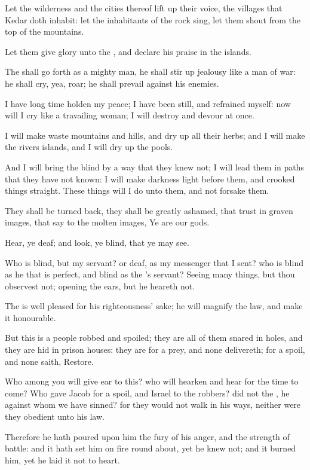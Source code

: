 \Verse Let the wilderness and the cities thereof lift up their voice, the villages that Kedar doth inhabit: let the inhabitants of the rock sing, let them shout from the top of the mountains.

\Verse Let them give glory unto the \LORD, and declare his praise in the islands.

\Verse The \LORD shall go forth as a mighty man, he shall stir up jealousy like a man of war: he shall cry, yea, roar; he shall prevail against his enemies.

\Verse I have long time holden my peace; I have been still, and refrained myself: now will I cry like a travailing woman; I will destroy and devour at once.

\Verse I will make waste mountains and hills, and dry up all their herbs; and I will make the rivers islands, and I will dry up the pools.

\Verse And I will bring the blind by a way that they knew not; I will lead them in paths that they have not known: I will make darkness light before them, and crooked things straight. These things will I do unto them, and not forsake them.

\Verse They shall be turned back, they shall be greatly ashamed, that trust in graven images, that say to the molten images, Ye are our gods.

\Verse Hear, ye deaf; and look, ye blind, that ye may see.

\Verse Who is blind, but my servant? or deaf, as my messenger that I sent?  who is blind as he that is perfect, and blind as the \LORD's servant?  \Verse Seeing many things, but thou observest not; opening the ears, but he heareth not.

\Verse The \LORD is well pleased for his righteousness' sake; he will magnify the law, and make it honourable.

\Verse But this is a people robbed and spoiled; they are all of them snared in holes, and they are hid in prison houses: they are for a prey, and none delivereth; for a spoil, and none saith, Restore.

\Verse Who among you will give ear to this? who will hearken and hear for the time to come?  \Verse Who gave Jacob for a spoil, and Israel to the robbers? did not the \LORD, he against whom we have sinned? for they would not walk in his ways, neither were they obedient unto his law.

\Verse Therefore he hath poured upon him the fury of his anger, and the strength of battle: and it hath set him on fire round about, yet he knew not; and it burned him, yet he laid it not to heart.


